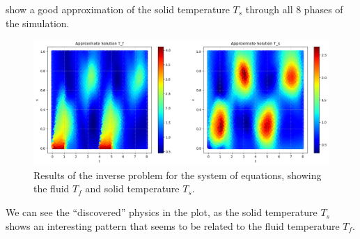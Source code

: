 \documentclass[unicode,11pt,a4paper,oneside,numbers=endperiod,openany]{scrartcl}
\begin{document}
show a good approximation of the solid temperature $T_s$ through all 8 phases of
the simulation.
\begin{figure}[h]
    \centering
    \includegraphics[width=\textwidth]{../Proj1_Y24/Task2/output.png}
    \caption{Results of the inverse problem for the system of equations, showing the fluid  $T_f$ and solid temperature $T_s$.}
    \label{fig:task2}
\end{figure}
We can see the ``discovered'' physics in the plot, as the solid temperature
$T_s$
shows an interesting pattern that seems to be related to the fluid temperature
$T_f$.
\end{document}

